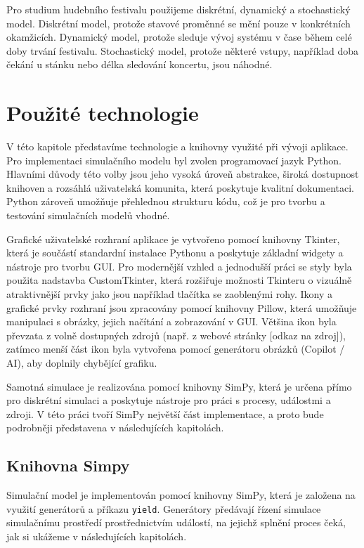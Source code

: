 \documentclass[
  program=itp,
  biblatex,
  figures=false,
  glossaries,
  index
]{kidiplom}
\begin{document}
Pro studium hudebního festivalu použijeme diskrétní, dynamický a stochastický model. Diskrétní model, protože stavové proměnné se mění pouze v konkrétních okamžicích. Dynamický model, protože sleduje vývoj systému v čase během celé doby trvání festivalu. Stochastický model, protože některé vstupy, například doba čekání u stánku nebo délka sledování koncertu, jsou náhodné.

\section{Použité technologie}
V této kapitole představíme technologie a knihovny využité při vývoji aplikace. Pro implementaci simulačního modelu byl zvolen programovací jazyk Python. Hlavními důvody této volby jsou jeho vysoká úroveň abstrakce, široká dostupnost knihoven a rozsáhlá uživatelská komunita, která poskytuje kvalitní dokumentaci. Python zároveň umožňuje přehlednou strukturu kódu, což je pro tvorbu a testování simulačních modelů vhodné.

Grafické uživatelské rozhraní aplikace je vytvořeno pomocí knihovny Tkinter, která je součástí standardní instalace Pythonu a poskytuje základní widgety a nástroje pro tvorbu GUI. Pro modernější vzhled a jednodušší práci se styly byla použita nadstavba CustomTkinter, která rozšiřuje možnosti Tkinteru o vizuálně atraktivnější prvky jako jsou například tlačítka se zaoblenými rohy. Ikony a grafické prvky rozhraní jsou zpracovány pomocí knihovny Pillow, která umožňuje manipulaci s obrázky, jejich načítání a zobrazování v GUI. Většina ikon byla převzata z volně dostupných zdrojů (např. z webové stránky [odkaz na zdroj]), zatímco menší část ikon byla vytvořena pomocí generátoru obrázků (Copilot / AI), aby doplnily chybějící grafiku.

Samotná simulace je realizována pomocí knihovny SimPy, která je určena přímo pro diskrétní simulaci a poskytuje nástroje pro práci s procesy, událostmi a zdroji. V této práci tvoří SimPy největší část implementace, a proto bude podrobněji představena v následujících kapitolách.

\subsection{Knihovna Simpy}
Simulační model je implementován pomocí knihovny SimPy, která je založena na využití generátorů a příkazu \texttt{yield}. 
Generátory předávají řízení simulace simulačnímu prostředí prostřednictvím událostí, 
na jejichž splnění proces čeká, jak si ukážeme v následujících kapitolách.
\end{document}
